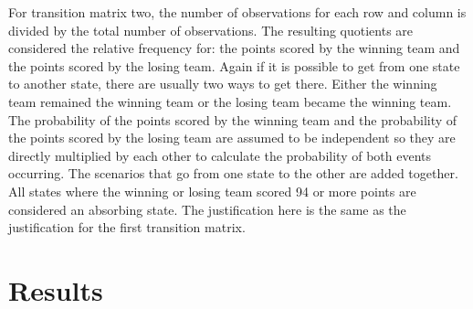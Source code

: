 \documentclass[
]{article}
\newenvironment{Shaded}{\begin{snugshade}}{\end{snugshade}}
\newcommand{\CommentTok}[1]{\textcolor[rgb]{0.56,0.35,0.01}{\textit{#1}}}
\newcommand{\DataTypeTok}[1]{\textcolor[rgb]{0.13,0.29,0.53}{#1}}
\newcommand{\KeywordTok}[1]{\textcolor[rgb]{0.13,0.29,0.53}{\textbf{#1}}}
\newcommand{\NormalTok}[1]{#1}
\newcommand{\StringTok}[1]{\textcolor[rgb]{0.31,0.60,0.02}{#1}}
\begin{document}
For transition matrix two, the number of observations for each row and
column is divided by the total number of observations. The resulting
quotients are considered the relative frequency for: the points scored
by the winning team and the points scored by the losing team. Again if
it is possible to get from one state to another state, there are usually
two ways to get there. Either the winning team remained the winning team
or the losing team became the winning team. The probability of the
points scored by the winning team and the probability of the points
scored by the losing team are assumed to be independent so they are
directly multiplied by each other to calculate the probability of both
events occurring. The scenarios that go from one state to the other are
added together. All states where the winning or losing team scored 94 or
more points are considered an absorbing state. The justification here is
the same as the justification for the first transition matrix.

\begin{Shaded}
\end{Shaded}

\hypertarget{results}{%
\section{Results}\label{results}}
\end{document}
